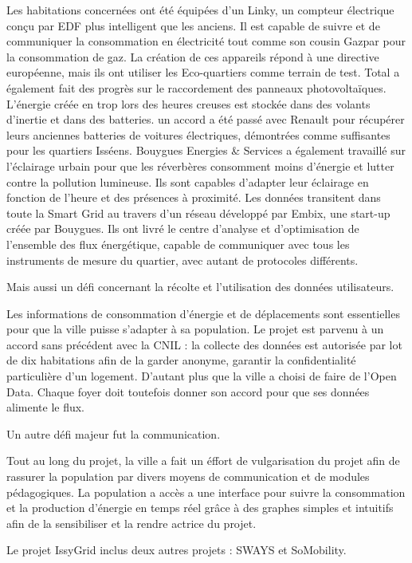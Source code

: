 Les habitations concernées ont été équipées d'un Linky, un compteur électrique conçu par EDF
plus intelligent que les anciens. Il est capable de suivre et de communiquer la consommation en 
électricité tout comme son cousin Gazpar pour la consommation de gaz. La création de ces appareils répond
à une directive européenne, mais ils ont utiliser les Eco-quartiers comme terrain de test.
Total a également fait des progrès sur le raccordement des panneaux photovoltaïques.  
L'énergie créée en trop lors des heures creuses est stockée dans des volants d'inertie et dans des 
batteries. un accord a été passé avec Renault pour récupérer leurs anciennes batteries de voitures 
électriques, démontrées comme suffisantes pour les quartiers Isséens. 
Bouygues Energies \& Services a également travaillé sur l'éclairage urbain pour que les réverbères 
consomment moins d'énergie et lutter contre la pollution lumineuse. Ils sont capables d'adapter
leur éclairage en fonction de l'heure et des présences à proximité.   
Les données transitent dans toute la Smart Grid au travers d'un réseau développé par Embix, une
start-up créée par Bouygues. Ils ont livré le centre d'analyse et d'optimisation de l'ensemble des
flux énergétique, capable de communiquer avec tous les instruments de mesure du quartier, avec autant de
protocoles différents.

Mais aussi un défi concernant la récolte et l'utilisation des données utilisateurs.

Les informations de consommation d'énergie et de déplacements sont essentielles pour que la ville
puisse s'adapter à sa population. Le projet est parvenu à un accord sans précédent avec la CNIL : 
la collecte des données est autorisée par lot de dix habitations afin de la garder anonyme, garantir
la confidentialité particulière d'un logement. 
D'autant plus que la ville a choisi de faire de l'Open Data. Chaque foyer doit toutefois
donner son accord pour que ses données alimente le flux.

Un autre défi majeur fut la communication. 

Tout au long du projet, la ville a fait un éffort de vulgarisation du projet afin de rassurer 
la population par divers moyens de communication et de modules pédagogiques. La population a accès 
a une interface pour suivre la consommation et la production d'énergie en temps réel grâce à des 
graphes simples et intuitifs afin de la sensibiliser et la rendre actrice du projet.
 
Le projet IssyGrid inclus deux autres projets : SWAYS et SoMobility.


